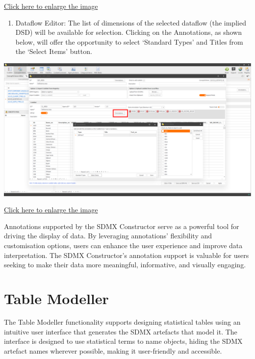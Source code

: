 \documentclass[
]{book}
\providecommand{\tightlist}{%
  \setlength{\itemsep}{0pt}\setlength{\parskip}{0pt}}
\begin{document}
\href{images/image10.png}{Click here to enlarge the image}

\begin{enumerate}
\def\labelenumi{\arabic{enumi}.}
\setcounter{enumi}{3}
\tightlist
\item
  Dataflow Editor: The list of dimensions of the selected dataflow (the implied DSD) will be available for selection. Clicking on the Annotations, as shown below, will offer the opportunity to select `Standard Types' and Titles from the `Select Items' button.
\end{enumerate}

\begin{center}\includegraphics[width=1\linewidth]{./images/image11} \end{center}

\href{images/image11.png}{Click here to enlarge the image}

Annotations supported by the SDMX Constructor serve as a powerful tool for driving the display of data. By leveraging annotations' flexibility and customisation options, users can enhance the user experience and improve data interpretation. The SDMX Constructor's annotation support is valuable for users seeking to make their data more meaningful, informative, and visually engaging.

\hypertarget{table-modeller}{%
\section{Table Modeller}\label{table-modeller}}

The Table Modeller functionality supports designing statistical tables using an intuitive user interface that generates the SDMX artefacts that model it. The interface is designed to use statistical terms to name objects, hiding the SDMX artefact names wherever possible, making it user-friendly and accessible.
\end{document}
